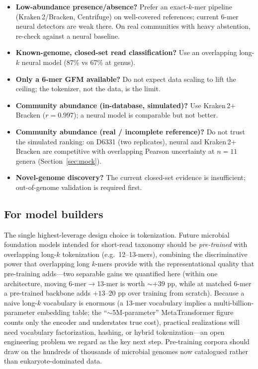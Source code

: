 \begin{boxtext}
\begin{itemize}\setlength{\itemsep}{1pt}
\item \textbf{Low-abundance presence/absence?} Prefer an exact-$k$-mer pipeline
(Kraken\,2/Bracken, Centrifuge) on well-covered references; current 6-mer neural
detectors are weak there. On real communities with heavy abstention, re-check
against a neural baseline.
\item \textbf{Known-genome, closed-set read classification?} Use an overlapping
long-$k$ neural model (87\% vs 67\% at genus).
\item \textbf{Only a 6-mer GFM available?} Do not expect data scaling to lift the
ceiling; the tokenizer, not the data, is the limit.
\item \textbf{Community abundance (in-database, simulated)?} Use
Kraken\,2$+$Bracken ($r=0.997$); a neural model is comparable but not better.
\item \textbf{Community abundance (real / incomplete reference)?} Do not trust
the simulated ranking: on D6331 (two replicates), neural and
Kraken\,2$+$Bracken are competitive with overlapping Pearson uncertainty at
$n{=}11$ genera (Section~\ref{sec:mock}).
\item \textbf{Novel-genome discovery?} The current closed-set evidence is
insufficient; out-of-genome validation is required first.
\end{itemize}
\end{boxtext}

\subsection{For model builders}

The single highest-leverage design choice is tokenization. Future microbial
foundation models intended for short-read taxonomy should be \emph{pre-trained}
with overlapping long-$k$ tokenization (e.g.\ 12--13-mers), combining the
discriminative power that overlapping long $k$-mers provide with the
representational quality that pre-training adds---two separable gains we
quantified here (within one architecture, moving 6-mer$\to$13-mer is worth
$\sim$$+39$ pp, while at matched 6-mer a pre-trained backbone adds $+13$--$20$ pp
over training from scratch). Because a
naive long-$k$ vocabulary is enormous (a 13-mer vocabulary implies a
multi-billion-parameter embedding table; the ``$\sim$5M-parameter''
MetaTransformer figure counts only the encoder and understates true cost),
practical realizations will need vocabulary factorization, hashing, or hybrid
tokenization---an open engineering problem we regard as the key next step.
Pre-training corpora should draw on the hundreds of thousands of microbial
genomes now catalogued \citep{Parks2022,Almeida2019} rather than
eukaryote-dominated data.
